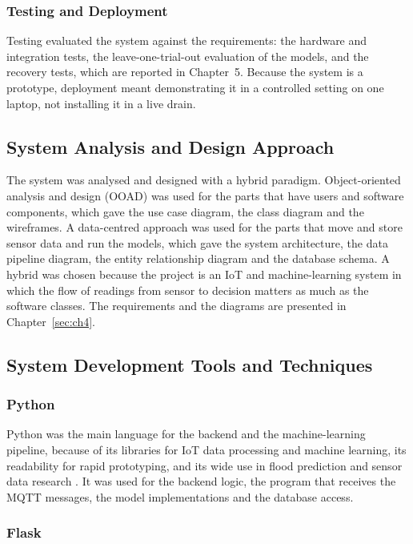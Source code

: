 \documentclass[12pt, a4paper]{article}
\begin{document}
\subsubsection{Testing and Deployment}

Testing evaluated the system against the requirements: the hardware and integration tests, the leave-one-trial-out evaluation of the models, and the recovery tests, which are reported in Chapter~5. Because the system is a prototype, deployment meant demonstrating it in a controlled setting on one laptop, not installing it in a live drain.

\subsection{System Analysis and Design Approach}
\label{sec:paradigm}

The system was analysed and designed with a hybrid paradigm. Object-oriented analysis and design (OOAD) was used for the parts that have users and software components, which gave the use case diagram, the class diagram and the wireframes. A data-centred approach was used for the parts that move and store sensor data and run the models, which gave the system architecture, the data pipeline diagram, the entity relationship diagram and the database schema. A hybrid was chosen because the project is an IoT and machine-learning system in which the flow of readings from sensor to decision matters as much as the software classes. The requirements and the diagrams are presented in Chapter~\ref{sec:ch4}.

\subsection{System Development Tools and Techniques}
\label{sec:tools}

\subsubsection{Python}

Python was the main language for the backend and the machine-learning pipeline, because of its libraries for IoT data processing and machine learning, its readability for rapid prototyping, and its wide use in flood prediction and sensor data research \citep{banupriya2025}. It was used for the backend logic, the program that receives the MQTT messages, the model implementations and the database access.

\subsubsection{Flask}
\end{document}
